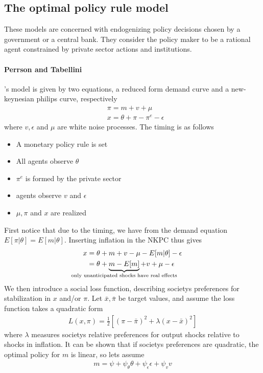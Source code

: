 \documentclass[12pt, a4paper]{article}
\begin{document}
\begin{spacing}{1.213}
\section{The optimal policy rule model}
These models are concerned with endogenizing policy decisions chosen by a government or a central bank. They consider the policy maker to be a rational agent constrained by private sector actions and institutions.

\paragraph{Perrson and Tabellini}'s model is given by two equations, a reduced form demand curve and a new-keynesian philips curve, respectively
\begin{align*}
&\pi = m + v + \mu \\
& x = \theta + \pi - \pi^e - \epsilon
\end{align*}
where $v, \epsilon$ and $\mu$ are white noise processes. The timing is as follows
\begin{itemize}
\item A monetary policy rule is set
\item All agents observe $\theta$
\item $\pi^e$ is formed by the private sector
\item agents observe $v$ and $\epsilon$
\item $\mu, \pi$ and $x$ are realized
\end{itemize}
First notice that due to the timing, we have from the demand equation $E[\pi| \theta] = E[m|\theta]$. Inserting inflation in the NKPC thus gives
\begin{align*}
x &= \theta + m + v -\mu - E[m|\theta] - \epsilon \\
& = \theta + \underbrace{m - E[m]}_{\mathclap{\text{only unanticipated shocks have real effects}}} + v + \mu - \epsilon
\end{align*}
We then introduce a social loss function, describing societys preferences for stabilization in $x$ and/or $\pi$. Let $\bar{x}, \bar{\pi}$ be target values, and assume the loss function takes a quadratic form
\begin{align*}
L(x, \pi) = \frac{1}{2}[(\pi - \bar{\pi})^2 + \lambda (x - \bar{x})^2 ]
\end{align*}
where $\lambda$ measures societys relative preferences for output shocks relative to shocks in inflation. It can be shown that if societys preferences are quadratic, the optimal policy for $m$ is linear, so lets assume
\begin{align*}
m = \psi + \psi_{\theta} \theta + \psi_{\epsilon} \epsilon + \psi_v v
\end{align*}

\end{spacing}
\end{document}
